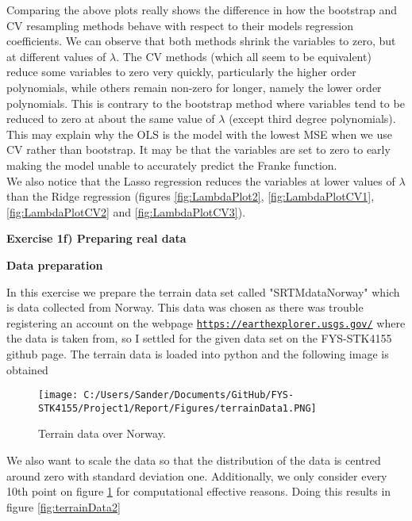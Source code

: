 \documentclass[12pt,a4paper]{article}
\begin{document}
\noindent Comparing the above plots really shows the difference in how the bootstrap and CV resampling methods behave with respect to their models regression coefficients. We can observe that both methods shrink the variables to zero, but at different values of $\lambda$. The CV methods (which all seem to be equivalent) reduce some variables to zero very quickly, particularly the higher order polynomials, while others remain non-zero for longer, namely the lower order polynomials. This is contrary to the bootstrap method where variables tend to be reduced to zero at about the same value of $\lambda$ (except third degree polynomials). This may explain why the OLS is the model with the lowest MSE when we use CV rather than bootstrap. It may be that the variables are set to zero to early making the model unable to accurately predict the Franke function.
\\
We also notice that the Lasso regression reduces the variables at lower values of $\lambda$ than the Ridge regression (figures \ref{fig:LambdaPlot2}, \ref{fig:LambdaPlotCV1}, \ref{fig:LambdaPlotCV2} and \ref{fig:LambdaPlotCV3}). 

\newpage

\begin{center}
\Large{\textbf{Exercise 1f) Preparing real data}}
\end{center}

\begin{center}
\large{\textbf{Data preparation}}
\end{center}

\noindent In this exercise we prepare the terrain data set called "SRTM\textunderscore data\textunderscore Norway" which is data collected from Norway. This data was chosen as there was trouble registering an account on the webpage \href{{https://earthexplorer.usgs.gov/}}{\nolinkurl{https://earthexplorer.usgs.gov/}} where the data is taken from, so I settled for the given data set on the FYS-STK4155 github page. The terrain data is loaded into python and the following image is obtained

\begin{figure}[H]
\centering
\texttt{[image: C:/Users/Sander/Documents/GitHub/FYS-STK4155/Project1/Report/Figures/terrainData1.PNG]}
\caption{\label{fig:terrainData1} Terrain data over Norway.}
\end{figure}

\noindent We also want to scale the data so that the distribution of the data is centred around zero with standard deviation one. Additionally, we only consider every 10th point on figure \ref{fig:terrainData1} for computational effective reasons. Doing this results in figure \ref{fig:terrainData2}
\end{document}
